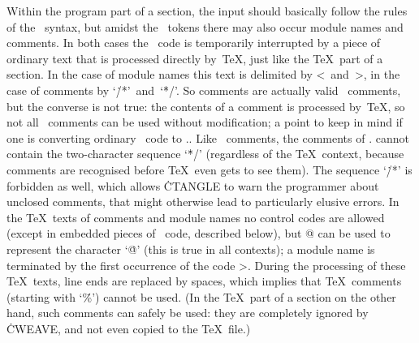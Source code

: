 Within the program part of a section, the input should basically follow the
rules of the \Cee~syntax, but amidst the \Cee~tokens there may also occur
module names and comments. In both cases the \Cee~code is temporarily
interrupted by a piece of ordinary text that is processed directly by~\TeX,
just like the \TeX~part of a section. In the case of module names this text
is delimited by \:<~and~\:>, in the case of comments by
`\.{/*}'~and~`\.{*/}'. So comments are actually valid \Cee~comments, but the
converse is not true: the contents of a comment is processed by~\TeX, so not
all \Cee~comments can be used without modification; a point to keep in mind
if one is converting ordinary \Cee~code to \CWEB.. Like \Cee~comments, the
comments of \CWEB. cannot contain the two-character sequence `\.{*/}'
(regardless of the \TeX~context, because comments are recognised before
\TeX\ even gets to see them). The sequence `\.{/*}' is forbidden as well,
which allows \.{CTANGLE} to warn the programmer about unclosed comments,
that might otherwise lead to particularly elusive errors. In the \TeX~texts
of comments and module names no control codes are allowed (except in
embedded pieces of \Cee~code, described below), but \:@ can be used to
represent the character `\.@' (this is true in all contexts); a module name
is terminated by the first occurrence of the code \:>. During the processing
of these \TeX~texts, line ends are replaced by spaces, which implies that
\TeX~comments (starting with `\.\%') cannot be used. (In the \TeX~part of a
section on the other hand, such comments can safely be used: they are
completely ignored by \.{CWEAVE}, and not even copied to the \TeX~file.)

